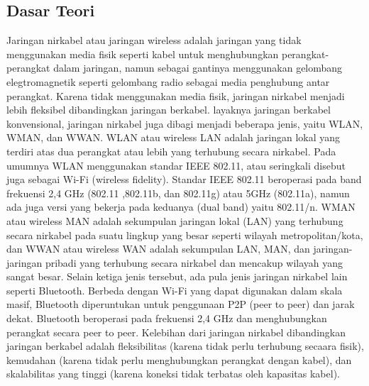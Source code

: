 \subsection{Dasar Teori}
Jaringan nirkabel atau jaringan wireless adalah jaringan yang tidak menggunakan media fisik seperti kabel untuk menghubungkan perangkat-perangkat dalam jaringan, namun sebagai gantinya menggunakan gelombang elegtromagnetik seperti gelombang radio sebagai media penghubung antar perangkat. Karena tidak menggunakan media fisik, jaringan nirkabel menjadi lebih fleksibel dibandingkan jaringan berkabel. layaknya jaringan berkabel konvensional, jaringan nirkabel juga dibagi menjadi beberapa jenis, yaitu WLAN, WMAN, dan WWAN. WLAN atau wireless LAN adalah jaringan lokal yang terdiri atas dua perangkat atau lebih yang terhubung secara nirkabel. Pada umumnya WLAN menggunakan standar IEEE 802.11, atau seringkali disebut juga sebagai Wi-Fi (wireless fidelity). Standar IEEE 802.11 beroperasi pada band frekuensi 2,4 GHz (802.11 ,802.11b, dan 802.11g) atau 5GHz (802.11a), namun ada juga versi yang bekerja pada keduanya (dual band) yaitu 802.11/n. WMAN atau wireless MAN adalah sekumpulan jaringan lokal (LAN) yang terhubung secara nirkabel pada suatu lingkup yang besar seperti wilayah metropolitan/kota, dan WWAN atau wireless WAN adalah sekumpulan LAN, MAN, dan jaringan-jaringan pribadi yang terhubung secara nirkabel dan mencakup wilayah yang sangat besar. Selain ketiga jenis tersebut, ada pula jenis jaringan nirkabel lain seperti Bluetooth. Berbeda dengan Wi-Fi yang dapat digunakan dalam skala masif, Bluetooth diperuntukan untuk penggunaan P2P (peer to peer) dan jarak dekat. Bluetooth beroperasi pada frekuensi 2,4 GHz dan menghubungkan perangkat secara peer to peer. Kelebihan dari jaringan nirkabel dibandingkan jaringan berkabel adalah fleksibilitas (karena tidak perlu terhubung secaara fisik), kemudahan (karena tidak perlu menghubungkan perangkat dengan kabel), dan skalabilitas yang tinggi (karena koneksi tidak terbatas oleh kapasitas kabel).

